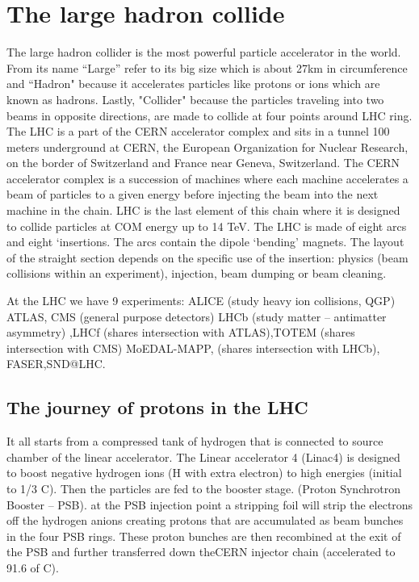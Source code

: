 \section{The large hadron collide}
The large hadron collider is the most powerful particle accelerator in the world. From its name “Large” refer to its big size which is about 27km in circumference and “Hadron" because it accelerates particles like protons or ions which are known as hadrons.
Lastly, "Collider" because the particles traveling into two beams in opposite directions, are made to collide at four points around LHC ring.
The LHC is a part of the CERN accelerator complex and sits in a tunnel 100 meters underground at CERN, the European Organization for Nuclear Research, on the border of Switzerland and France near Geneva, Switzerland.
The CERN accelerator complex is a succession of machines where each machine accelerates a beam of particles to a given energy before injecting the beam into the next machine in the chain. LHC is the last element of this chain where it is designed to collide particles at COM energy up to 14 TeV.
The LHC is made of eight arcs and eight ‘insertions. The arcs contain the dipole ‘bending’ magnets. The layout of the straight section depends on the specific use of the insertion: physics (beam collisions within an experiment), injection, beam dumping or beam cleaning.


At the LHC we have 9 experiments:
ALICE (study heavy ion collisions, QGP) ATLAS, CMS  (general purpose detectors) LHCb (study matter – antimatter asymmetry) ,LHCf (shares intersection with ATLAS),TOTEM (shares intersection with CMS) MoEDAL-MAPP, (shares intersection with LHCb), FASER,SND@LHC.

\subsection{The journey of protons in the LHC}

It all starts from a compressed tank of hydrogen that is connected to source chamber of the linear accelerator.
The Linear accelerator 4 (Linac4) is designed to boost negative hydrogen ions (H with extra electron) to high energies (initial to 1/3 C).
Then the particles are fed to the booster stage. (Proton Synchrotron Booster – PSB).
at the PSB injection point a stripping foil will strip the electrons off the hydrogen anions creating protons that are accumulated as beam bunches in the four PSB rings.
These proton bunches are then recombined at the exit of the PSB and further transferred down theCERN injector chain (accelerated to 91.6 of C).

